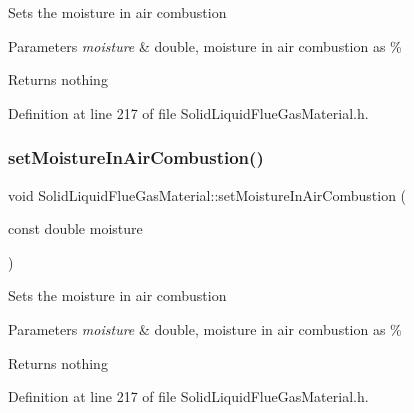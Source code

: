 Sets the moisture in air combustion 
\begin{DoxyParams}{Parameters}
{\em moisture} & double, moisture in air combustion as \% \\
\hline
\end{DoxyParams}
\begin{DoxyReturn}{Returns}
nothing 
\end{DoxyReturn}


Definition at line 217 of file Solid\+Liquid\+Flue\+Gas\+Material.\+h.

\mbox{\label{class_solid_liquid_flue_gas_material_a1a5f1bd3008e78cce62edb8aca642284}} 
\subsubsection{\texorpdfstring{set\+Moisture\+In\+Air\+Combustion()}{setMoistureInAirCombustion()}\hspace{0.1cm}{\footnotesize\ttfamily [2/3]}}
{\footnotesize\ttfamily void Solid\+Liquid\+Flue\+Gas\+Material\+::set\+Moisture\+In\+Air\+Combustion (\begin{DoxyParamCaption}\item[{const double}]{moisture }\end{DoxyParamCaption})\hspace{0.3cm}{\ttfamily [inline]}}

Sets the moisture in air combustion 
\begin{DoxyParams}{Parameters}
{\em moisture} & double, moisture in air combustion as \% \\
\hline
\end{DoxyParams}
\begin{DoxyReturn}{Returns}
nothing 
\end{DoxyReturn}


Definition at line 217 of file Solid\+Liquid\+Flue\+Gas\+Material.\+h.

\mbox{\label{class_solid_liquid_flue_gas_material_a1a5f1bd3008e78cce62edb8aca642284}} 
